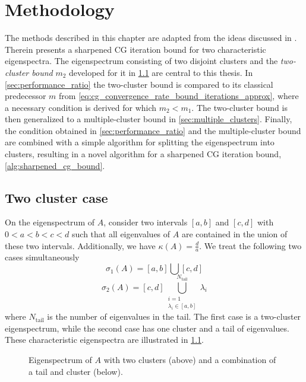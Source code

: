 \chapter{Methodology}\label{ch:methods}
The methods described in this chapter are adapted from the ideas discussed in \cite[Section 4]{cg_sharpened_convrate_Axelsson1976}. Therein \citeauthor{cg_sharpened_convrate_Axelsson1976} presents a sharpened CG iteration bound for two characteristic eigenspectra. The eigenspectrum consisting of two disjoint clusters and the \textit{two-cluster bound} $m_2$ developed for it in \cref{sec:cg_sharpened_convrate} are central to this thesis. In \cref{sec:performance_ratio} the two-cluster bound is compared to its classical predecessor $m$ from \cref{eq:cg_convergence_rate_bound_iterations_approx}, where a necessary condition is derived for which $m_2 < m_1$. The two-cluster bound is then generalized to a multiple-cluster bound in \cref{sec:multiple_clusters}. Finally, the condition obtained in \cref{sec:performance_ratio} and the multiple-cluster bound are combined with a simple algorithm for splitting the eigenspectrum into clusters, resulting in a novel algorithm for a sharpened CG iteration bound, \cref{alg:sharpened_cg_bound}.

\section{Two cluster case}\label{sec:cg_sharpened_convrate}
On the eigenspectrum of $A$, consider two intervals $[a, b]$ and $[c, d]$ with $0 < a < b < c < d$ such that all eigenvalues of $A$ are contained in the union of these two intervals. Additionally, we have $\kappa(A) = \frac{d}{a}$. We treat the following two cases simultaneously
\begin{equation}
    \sigma_1(A) = [a,b] \bigcup [c,d]
    \label{eq:two_clusters}
\end{equation}
\begin{equation}
    \sigma_2(A) = [c,d] \bigcup_{\substack{i=1 \\ \lambda_i \in [a,b]}}^{N_{\text{tail}}} \lambda_i
    \label{eq:one_cluster_with_tail}
\end{equation}
where $N_{\text{tail}}$ is the number of eigenvalues in the tail. The first case is a two-cluster eigenspectrum, while the second case has one cluster and a tail of eigenvalues. These characteristic eigenspectra are illustrated in \cref{fig:eigenvalue_clusters}.
\begin{figure}[H]
    \centering
    
    \caption{Eigenspectrum of $A$ with two clusters (above) and a combination of a tail and cluster (below).}
    \label{fig:eigenvalue_clusters}
\end{figure}

